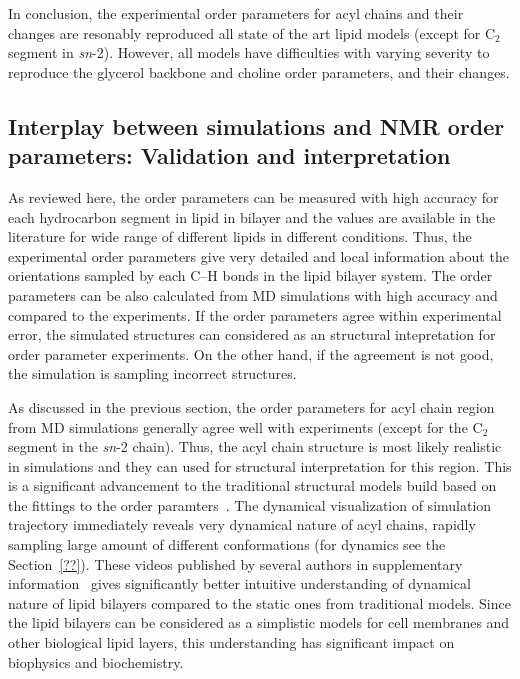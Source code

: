 \documentclass[aps,prl,superscriptaddress,twocolumn]{revtex4}
\begin{document}
In conclusion, the experimental order parameters for acyl chains and their changes are resonably
reproduced all state of the art lipid models (except for C$_2$ segment in {\it sn}-2).
However, all models have difficulties with varying severity to reproduce the glycerol backbone
and choline order parameters, and their changes.



\subsection{Interplay between simulations and NMR order parameters: Validation and interpretation}

As reviewed here, the order parameters can be measured with high accuracy for each hydrocarbon segment in lipid
in bilayer and the values are available in the literature for wide range of different lipids in different conditions.
Thus, the experimental order parameters give very detailed and local information about the orientations
sampled by each C--H bonds in the lipid bilayer system. The order parameters can 
be also calculated from MD simulations with high accuracy and compared to the experiments.
If the order parameters agree within experimental error, the simulated structures can considered as
an structural intepretation for order parameter experiments. On the other hand, if the agreement is not good, 
the simulation is sampling incorrect structures.

As discussed in the previous section, the order parameters for acyl chain region from MD simulations generally 
agree well with experiments (except for the C$_2$ segment in the {\it sn}-2 chain). Thus, the acyl chain structure 
is most likely realistic in simulations and they can used for structural interpretation for this region. 
This is a significant advancement to the traditional structural models build based on the 
fittings to the order paramters~\cite{??}. The dynamical visualization of simulation trajectory immediately 
reveals very dynamical nature of acyl chains, rapidly sampling large amount of different conformations 
(for dynamics see the Section~\ref{??}). These videos published by several authors in supplementary information~\cite{??}
gives significantly better intuitive understanding of dynamical nature of lipid bilayers compared to the static ones from 
traditional models. Since the lipid bilayers can be considered as a simplistic models for cell
membranes and other biological lipid layers, this understanding has significant impact on
biophysics and biochemistry. 
\end{document}
